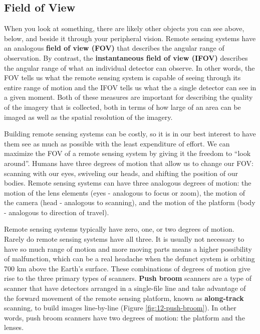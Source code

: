 \documentclass[
]{book}
\begin{document}
\hypertarget{field-of-view}{%
\subsection{Field of View}\label{field-of-view}}

When you look at something, there are likely other objects you can see above, below, and beside it through your peripheral vision. Remote sensing systems have an analogous \textbf{field of view (FOV)} that describes the angular range of observation. By contrast, the \textbf{instantaneous field of view (IFOV)} describes the angular range of what an individual detector can observe. In other words, the FOV tells us what the remote sensing system is capable of seeing through its entire range of motion and the IFOV tells us what the a single detector can see in a given moment. Both of these measures are important for describing the quality of the imagery that is collected, both in terms of how large of an area can be imaged as well as the spatial resolution of the imagery.

Building remote sensing systems can be costly, so it is in our best interest to have them see as much as possible with the least expenditure of effort. We can maximize the FOV of a remote sensing system by giving it the freedom to ``look around''. Humans have three degrees of motion that allow us to change our FOV: scanning with our eyes, swiveling our heads, and shifting the position of our bodies. Remote sensing systems can have three analogous degrees of motion: the motion of the lens elements (eyes - analogous to focus or zoom), the motion of the camera (head - analogous to scanning), and the motion of the platform (body - analogous to direction of travel).

Remote sensing systems typically have zero, one, or two degrees of motion. Rarely do remote sensing systems have all three. It is usually not necessary to have so much range of motion and more moving parts means a higher possibility of malfunction, which can be a real headache when the defunct system is orbiting 700 km above the Earth's surface. These combinations of degrees of motion give rise to the three primary types of scanners. \textbf{Push broom} scanners are a type of scanner that have detectors arranged in a single-file line and take advantage of the forward movement of the remote sensing platform, known as \textbf{along-track} scanning, to build images line-by-line (Figure \ref{fig:12-push-broom}). In other words, push broom scanners have two degrees of motion: the platform and the lenses.
\end{document}

